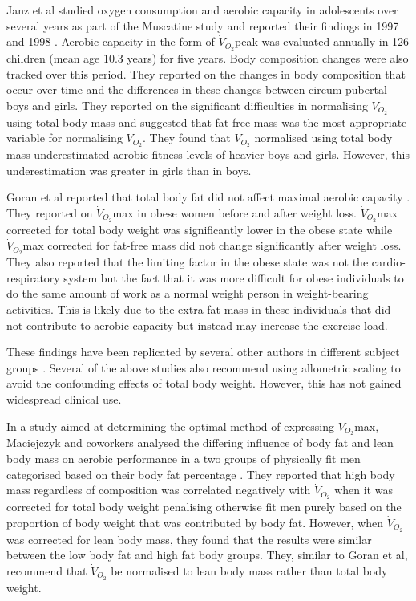 Janz et al studied oxygen consumption and aerobic capacity in adolescents over several years as part of the Muscatine study and reported their findings in 1997\parencite{janz_three-year_1997} and 1998 \parencite{janz_longitudinal_1998}. Aerobic capacity in the form of $\dot{V}_{O_2}$peak was evaluated annually in 126 children (mean age 10.3 years) for five years. Body composition changes were also tracked over this period. They reported on the changes in body composition that occur over time and the differences in these changes between circum-pubertal boys and girls. They reported on the significant difficulties in normalising $\dot{V}_{O_2}$ using total body mass and suggested that fat-free mass was the most appropriate variable for normalising $\dot{V}_{O_2}$. They found that $\dot{V}_{O_2}$ normalised using total body mass underestimated aerobic fitness levels of heavier boys and girls. However, this underestimation was greater in girls than in boys. 

Goran et al reported that total body fat did not affect maximal aerobic capacity \parencite{goran_total_2000}. They reported on $\dot{V}_{O_2}$max in obese women before and after weight loss. $\dot{V}_{O_2}$max corrected for total body weight was significantly lower in the obese state while $\dot{V}_{O_2}$max corrected for fat-free mass did not change significantly after weight loss. They also reported that the limiting factor in the obese state was not the cardio-respiratory system but the fact that it was more difficult for obese individuals to do the same amount of work as a normal weight person in weight-bearing activities. This is likely due to the extra fat mass in these individuals that did not contribute to aerobic capacity but instead may increase the exercise load.

These findings have been replicated by several other authors in different subject groups \parencite{loftin_scaling_2001,  lemaitre_maximum_2006,savonen_current_2012, krachler_cardiopulmonary_2014}. Several of the above studies also recommend using allometric scaling to avoid the confounding effects of total body weight. However, this has not gained widespread clinical use.

In a study aimed at determining the optimal method of expressing $\dot{V}_{O_2}$max, Maciejczyk and coworkers analysed the differing influence of body fat and lean body mass on aerobic performance in a two groups of physically fit men categorised based on their body fat percentage \parencite{maciejczyk_influence_2014}. They reported that high body mass regardless of composition was correlated negatively with $\dot{V}_{O_2}$ when it was corrected for total body weight penalising otherwise fit men purely based on the proportion of body weight that was contributed by body fat. However, when $\dot{V}_{O_2}$ was corrected for lean body mass, they found that the results were similar between the low body fat and high fat body groups. They, similar to Goran et al\parencite{goran_total_2000}, recommend that $\dot{V}_{O_2}$ be normalised to lean body mass rather than total body weight.

